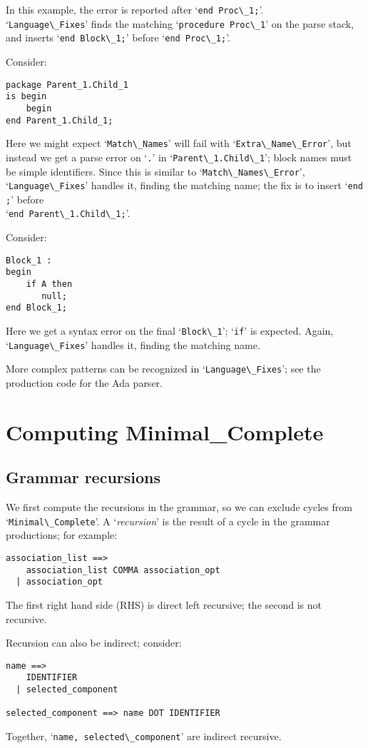 \documentclass[authordraft]{acmart}
\newcommand{\code}[1]{`\lstinline|#1|'}
\begin{document}
In this example, the error is reported after \code{end Proc\_1;}.\\
\code{Language\_Fixes} finds the matching \code{procedure Proc\_1} on
the parse stack, and inserts \code{end Block\_1;} before
\code{end Proc\_1;}.

Consider:
\begin{lstlisting}
package Parent_1.Child_1
is begin
    begin
end Parent_1.Child_1;
\end{lstlisting}
Here we might expect \code{Match\_Names} will fail with
\code{Extra\_Name\_Error}, but instead we get a parse error on \code{.}
in \code{Parent\_1.Child\_1}; block names must be simple identifiers.
Since this is similar to \code{Match\_Names\_Error},
\code{Language\_Fixes} handles it, finding the matching name; the
fix is to insert \code{end ;} before\\ \code{end Parent\_1.Child\_1;}.

Consider:
\begin{lstlisting}
Block_1 :
begin
    if A then
       null;
end Block_1;
\end{lstlisting}
Here we get a syntax error on the final \code{Block\_1}; \code{if} is
expected. Again, \code{Language\_Fixes} handles it, finding the
matching name.

More complex patterns can be recognized in \code{Language\_Fixes}; see
the production code for the Ada parser.

\section{Computing Minimal\_Complete}
\label{sect:minimal-complete-compute}

\subsection{Grammar recursions}
We first compute the recursions in the grammar, so we can exclude
cycles from \code{Minimal\_Complete}. A `{\it recursion}' is
the result of a cycle in the grammar productions; for example:
\begin{verbatim}
association_list ==>
    association_list COMMA association_opt
  | association_opt
\end{verbatim}
The first right hand side (RHS) is direct left recursive; the second
is not recursive.

Recursion can also be indirect; consider:
\begin{verbatim}
name ==>
    IDENTIFIER
  | selected_component

selected_component ==> name DOT IDENTIFIER
\end{verbatim}
Together, \code{name, selected\_component} are indirect recursive.
\end{document}
